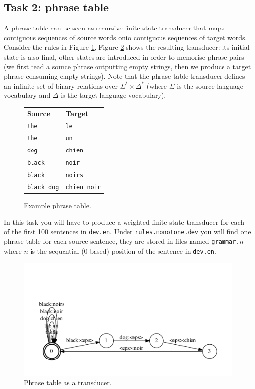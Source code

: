 \subsection{Task 2: phrase table}


A phrase-table can be seen as recursive finite-state transducer that maps contiguous sequences of source words onto contiguous sequences of target words. 
Consider the rules in Figure \ref{fig:table}, Figure \ref{fig:rules} shows the resulting transducer: its initial state is also final, other states are introduced in order to memorise phrase pairs (we first read a source phrase outputting empty strings, then we produce a target phrase consuming empty strings).
Note that the phrase table transducer defines an infinite set of binary relations over $\Sigma^* \times \Delta^*$ (where $\Sigma$ is the source language vocabulary and $\Delta$ is the target language vocabulary).


\begin{figure}[h]\centering
\begin{tabular}{l l }
\bf Source & \bf Target \\
\texttt{the} & \texttt{le}  \\
\texttt{the} & \texttt{un} \\
\texttt{dog} & \texttt{chien} \\
\texttt{black} & \texttt{noir} \\
\texttt{black} & \texttt{noirs} \\
\texttt{black dog} & \texttt{chien noir} 
\end{tabular}
\caption{\label{fig:table}Example phrase table.}
\end{figure}


In this task you will have to produce a weighted finite-state transducer for each of the first 100 sentences in \texttt{dev.en}. 
Under \texttt{rules.monotone.dev} you will find one phrase table for each source sentence, they are stored in files named \texttt{grammar.$n$} where \texttt{$n$} is the sequential (0-based) position of the sentence in \texttt{dev.en}.


\begin{figure}[h]\centering
\includegraphics[scale=0.5]{table.pdf}
\caption{\label{fig:rules}Phrase table as a transducer.}
\end{figure}

